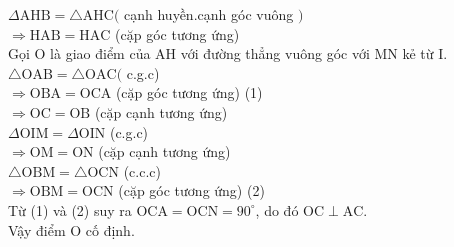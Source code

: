 \begin{bt}
{\begin{enumerate}
        $\Delta \mathrm{AHB}=\triangle \mathrm{AHC}($ cạnh huyền.cạnh góc vuông $)$\\[5px]
        $\Rightarrow \mathrm{HAB}=\mathrm{HAC}$ (cặp góc tương ứng)\\[5px]
        Gọi $\mathrm{O}$ là giao điểm của $\mathrm{AH}$ với đường thẳng vuông góc với $\mathrm{MN}$ kẻ từ $\mathrm{I}$.\\[5px]
        $\triangle \mathrm{OAB}=\triangle \mathrm{OAC}($ c.g.c)\\[5px]
        $\Rightarrow \mathrm{OBA}=\mathrm{OCA}$ (cặp góc tương ứng) (1)\\[5px]
        $\Rightarrow \mathrm{OC}=\mathrm{OB}$ (cặp cạnh tương ứng)\\[5px]
        $\Delta \mathrm{OIM}=\Delta \mathrm{OIN}$ (c.g.c)\\[5px]
        $\Rightarrow \mathrm{OM}=\mathrm{ON}$ (cặp cạnh tương ứng)\\[5px]
        $\triangle \mathrm{OBM}=\triangle \mathrm{OCN}$ (c.c.c)\\[5px]
        $\Rightarrow \mathrm{OBM}=\mathrm{OCN}$ (cặp góc tương ứng) (2)\\[5px]
        Từ (1) và (2) suy ra $\mathrm{OCA}=\mathrm{OCN}=90^{\circ}$, do đó $\mathrm{OC} \perp \mathrm{AC}$.\\[5px]
        Vậy điểm $\mathrm{O}$ cố định.
    \end{enumerate}
}
\end{bt}

